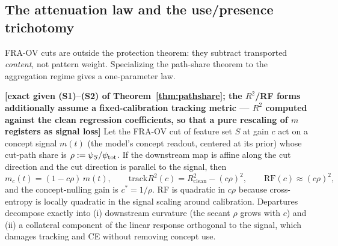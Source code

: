\documentclass{article}
\begin{document}
\subsection{The attenuation law and the use/presence trichotomy}

FRA-OV cuts are outside the protection theorem: they subtract transported \emph{content}, not pattern weight. Specializing the path-share theorem to the aggregation regime gives a one-parameter law.

\begin{prop}\label{prop:attenuation}
\textbf{[exact given (S1)--(S2) of Theorem~\ref{thm:pathshare}; the $R^2$/RF forms additionally assume a fixed-calibration tracking metric --- $R^2$ computed against the clean regression coefficients, so that a pure rescaling of $m$ registers as signal loss]} Let the FRA-OV cut of feature set $S$ at gain $c$ act on a concept signal $m(t)$ (the model's concept readout, centered at its prior) whose cut-path share is $\rho := \psi_S/\psi_{\mathrm{tot}}$. If the downstream map is affine along the cut direction and the cut direction is parallel to the signal, then
\begin{equation}\label{eq:attenuation}
    m_c(t) = (1 - c\rho)\, m(t), \qquad
    \mathrm{track}R^2(c) = R^2_{\mathrm{clean}} - (c\rho)^2, \qquad
    \mathrm{RF}(c) \approx (c\rho)^2 ,
\end{equation}
and the concept-nulling gain is $c^* = 1/\rho$. RF is quadratic in $c\rho$ because cross-entropy is locally quadratic in the signal scaling around calibration. Departures decompose exactly into (i) downstream curvature (the secant $\rho$ grows with $c$) and (ii) a collateral component of the linear response orthogonal to the signal, which damages tracking and CE without removing concept use.
\end{prop}
\end{document}

